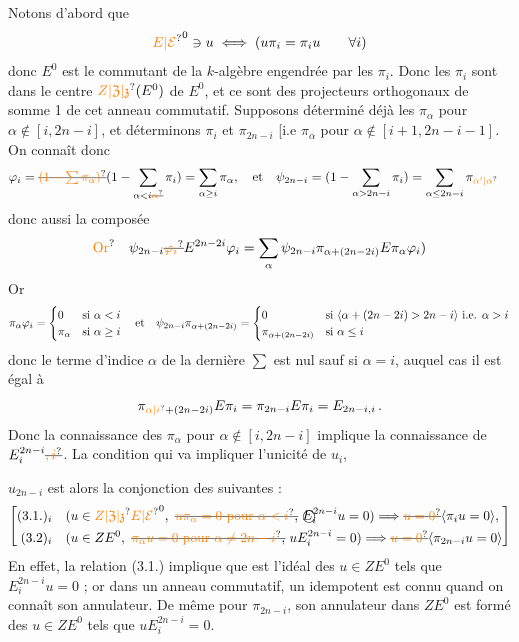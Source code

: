 Notons d'abord que
\[
 \unsure{E|\mathcal E}^0\ni u\iff (u\pi_i=\pi_i u\qquad\forall i)
\]
donc $E^0$ est le commutant de la $k$-algèbre engendrée par les $\pi_i$. Donc les $\pi_i$ sont dans le centre $\unsure{Z|\mathfrak Z|\mathfrak z}(E^0)$ de $E^0$, et ce sont des projecteurs  orthogonaux de somme 1 de cet anneau commutatif. Supposons déterminé déjà les $\pi_\alpha$ pour $\alpha\notin[i,2n-i]$,  et déterminons $\pi_i$ et $\pi_{2n-i}$ [i.e $\pi_\alpha$ pour $\alpha\notin[i+1,2n-i-1]$.  On connaît donc
\[
 \begin{aligned}
 \varphi_i&=\deleted{\unsure{(1-\sum\pi_\alpha)}}(1-\sum_{\alpha<i\deleted{\unsure{\alpha}}}\pi_i)=\sum_{\alpha\ge i}\pi_\alpha,\quad\text{et}\quad
 \psi_{2n-i}=(1-\sum_{\alpha>2n-i}\pi_i)=\sum_{\alpha\le 2n-i}\pi_{\unsure{\alpha'|\alpha}}
 \end{aligned}
\]
donc aussi la composée
\[
 \unsure{\text{Or}}\quad \psi_{2n-i}\deleted{\unsure{\varphi_i}}E^{2n-2i}\varphi_i
 =\sum_\alpha\psi_{2n-i}\pi_{\alpha+(2n-2i)}E\pi_\alpha\varphi_i)
\]
Or
\[
 \pi_\alpha\varphi_i=\begin{cases}0&\text{si }\alpha<i\\ \pi_\alpha&\text{si }\alpha\ge i\end{cases}
 \quad\text{et}\quad
 \psi_{2n-i}\pi_{\alpha+(2n-2i)}
 =\begin{cases}
 0&\text{si }\inserted{\alpha+(2n-2i)>2n-i}\ \text{i.e. }\alpha>i\\
 \pi_{\alpha+(2n-2i)}&\text{si }\alpha\le i
 \end{cases}
\]
donc le terme d'indice $\alpha$ de la dernière $\sum$ est nul sauf si $\alpha=i$, auquel cas il est égal à
\[
 \pi_{\unsure{\alpha|i}+(2n-2i)}E\pi_i=\pi_{2n-i}E\pi_i=E_{2n-i,i}\,.
\]
Donc la connaissance des $\pi_\alpha$ pour $\alpha\notin[i,2n-i]$ implique la connaissance de $E^{2n-i}_{i}\deleted{\unsure{,i}}$.  La condition qui va impliquer l'unicité  de $u_i$,

$u_{2n-i}$ est alors la  conjonction des suivantes :
\[
\left[\begin{aligned}
 (3.1.)_i\quad &(u\in \unsure{Z|\mathfrak Z|\mathfrak z}\unsure{E|\mathcal E}^0,\ \deleted{\unsure{u\pi_\alpha=0\ \text{pour }\alpha<i},}\ 
 \text{\textcircled{$E_i^{2n-i}$}}u=0)\Longrightarrow \deleted{\unsure{u=0}}\inserted{\pi_i u=0},\\
 (3.2)_i\quad &(u\in ZE^0,\ \deleted{\unsure{\pi_\alpha u=0\ \text{pour }\alpha\ne 2n-i},}\ uE_i^{2n-i}=0)
 \Longrightarrow\deleted{\unsure{u=0}}\inserted{\pi_{2n-i}u=0}
\end{aligned}\right]
\]
En effet, la relation (3.1.) implique que   est l'idéal des $u\in ZE^0$ tels que $E_i^{2n-i}u=0$ ; or dans un anneau commutatif, un idempotent est connu quand on connaît son annulateur. De même pour $\pi_{2n-i}$, son annulateur dans $ZE^0$ est formé des $u\in ZE^0$ tels que $uE_i^{2n-i}=0$.

